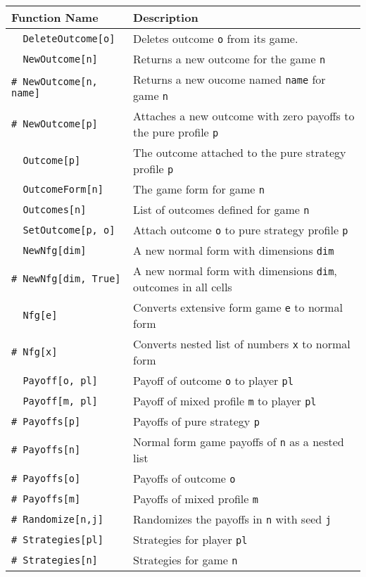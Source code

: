\begin{table}[htp]
\begin{center}
\begin{tabular} {|l||l|} \hline
Function Name	& Description \\ 
\hline
\verb+  DeleteOutcome[o]+ &Deletes outcome \verb+o+ from its game. \\

\verb+  NewOutcome[n]+ &Returns a new outcome for the game \verb+n+\\ 
\verb+# NewOutcome[n, name]+ &Returns a new oucome named \verb+name+ for game \verb+n+ \\ 
\verb+# NewOutcome[p]+ &Attaches a new outcome with zero payoffs to
the pure profile \verb+p+\\ 

\verb+  Outcome[p]+ &The outcome attached to the pure strategy profile \verb+p+\\ 

\verb+  OutcomeForm[n]+ &The game form for game \verb+n+\\ 

\verb+  Outcomes[n]+ &List of outcomes defined for game \verb+n+\\ 

\verb+  SetOutcome[p, o]+ &Attach outcome \verb+o+ to pure strategy profile \verb+p+\\ 

\verb+  NewNfg[dim]+ &A new normal form with dimensions \verb+dim+\\ 
\verb+# NewNfg[dim, True]+ &A new normal form with dimensions \verb+dim+, outcomes in all cells\\ 

\verb+  Nfg[e]+ &Converts extensive form game \verb+e+ to normal form\\ 
\verb+# Nfg[x]+ &Converts nested list of numbers \verb+x+ to normal form\\ 

\verb+  Payoff[o, pl]+ &Payoff of outcome \verb+o+ to player \verb+pl+\\ 
\verb+  Payoff[m, pl]+ &Payoff of mixed profile \verb+m+ to player \verb+pl+\\ 

\verb+# Payoffs[p]+ &Payoffs of pure strategy \verb+p+\\ 
\verb+# Payoffs[n]+ &Normal form game payoffs of \verb+n+ as a nested list\\ 
\verb+# Payoffs[o]+ &Payoffs of outcome \verb+o+\\ 
\verb+# Payoffs[m]+ &Payoffs of mixed profile \verb+m+ \\ 
\verb+# Randomize[n,j]+ &Randomizes the payoffs in \verb+n+ with seed \verb+j+\\
\verb+# Strategies[pl]+ &Strategies for player \verb+pl+\\ 
\verb+# Strategies[n]+ &Strategies for game \verb+n+ \\ 


\end{tabular}
\end{center}
\end{table}
